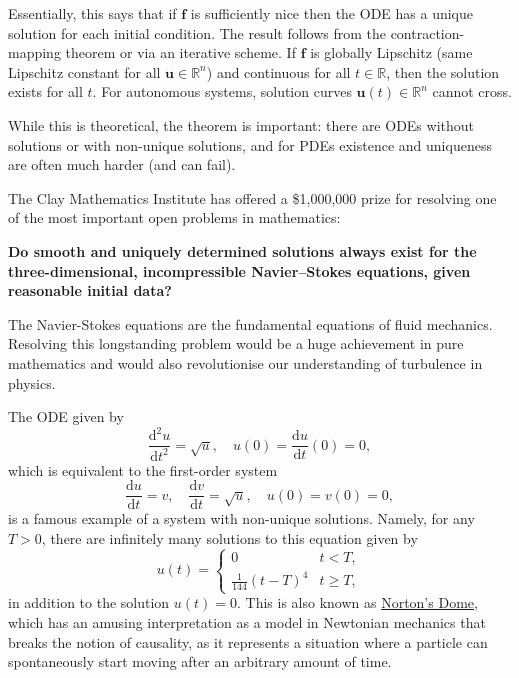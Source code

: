 \documentclass[
  letterpaper,
  DIV=11,
  numbers=noendperiod]{scrreprt}
\newenvironment{fbxSimple}[3]{\begin{tcolorbox}[enhanced, breakable,%
attach boxed title to top*={xshift=1.4pt},
boxed title style={boxrule=0.0mm, fuzzy shadow={1pt}{-1pt}{0mm}{0.1mm}{gray}, arc=.3em, rounded corners=east, sharp corners=west}, colframe=#1-color2, colbacktitle=#1-color1, colback = white, coltitle=black,  titlerule=0mm, toprule=0pt, bottomrule=.7pt, leftrule=.3em, rightrule=.7pt, outer arc=.3em,  	left=.5em, right=.5em, bottomtitle=1mm, toptitle=1mm,title=\textbf{#2}\hspace{0.5em}{#3}]}
{\end{tcolorbox}}
\begin{document}
Essentially, this says that if \(\mathbf{f}\) is sufficiently nice then
the ODE has a unique solution for each initial condition. The result
follows from the contraction-mapping theorem or via an iterative scheme.
If \(\mathbf{f}\) is globally Lipschitz (same Lipschitz constant for all
\(\mathbf{u}\in\mathbb{R}^n\)) and continuous for all
\(t\in\mathbb{R}\), then the solution exists for all \(t\). For
autonomous systems, solution curves \(\mathbf{u}(t)\in\mathbb{R}^n\)
cannot cross.

While this is theoretical, the theorem is important: there are ODEs
without solutions or with non-unique solutions, and for PDEs existence
and uniqueness are often much harder (and can fail).

\begin{tcolorbox}[enhanced jigsaw, bottomrule=.15mm, colbacktitle=quarto-callout-note-color!10!white, breakable, arc=.35mm, coltitle=black, colback=white, bottomtitle=1mm, opacityback=0, title=\textcolor{quarto-callout-note-color}{\faInfo}\hspace{0.5em}{Millennium Prize Problem: Navier--Stokes Equations}, titlerule=0mm, toptitle=1mm, opacitybacktitle=0.6, colframe=quarto-callout-note-color-frame, leftrule=.75mm, rightrule=.15mm, left=2mm, toprule=.15mm]

The Clay Mathematics Institute has offered a \$1,000,000 prize for
resolving one of the most important open problems in mathematics:

\textbf{Do smooth and uniquely determined solutions always exist for the
three-dimensional, incompressible Navier--Stokes equations, given
reasonable initial data?}

The Navier-Stokes equations are the fundamental equations of fluid
mechanics. Resolving this longstanding problem would be a huge
achievement in pure mathematics and would also revolutionise our
understanding of turbulence in physics.

\end{tcolorbox}

\label{eg-5.1}
\begin{fbxSimple}{eg}{Example 5.1}{}
\label{eg-5.1}
The ODE given by \[
\frac{\mathrm{d}^2u}{\mathrm{d}t^2} = \sqrt{u}, \quad u(0) = \frac{\mathrm{d}u}{\mathrm{d}t}(0) = 0,
\] which is equivalent to the first-order system \[
\frac{\mathrm{d}u}{\mathrm{d}t} = v, \quad \frac{\mathrm{d}v}{\mathrm{d}t} = \sqrt{u}, \quad u(0) = v(0) = 0,
\] is a famous example of a system with non-unique solutions. Namely,
for any \(T > 0\), there are infinitely many solutions to this equation
given by \[
u(t) = \begin{cases}
    0 & t < T,\\
    \frac{1}{144}(t-T)^4 & t \geq T,
\end{cases}
\] in addition to the solution \(u(t) = 0\). This is also known as
\href{https://arxiv.org/abs/1801.01719v3}{Norton's Dome}, which has an
amusing interpretation as a model in Newtonian mechanics that breaks the
notion of causality, as it represents a situation where a particle can
spontaneously start moving after an arbitrary amount of time.

\end{fbxSimple}
\end{document}
